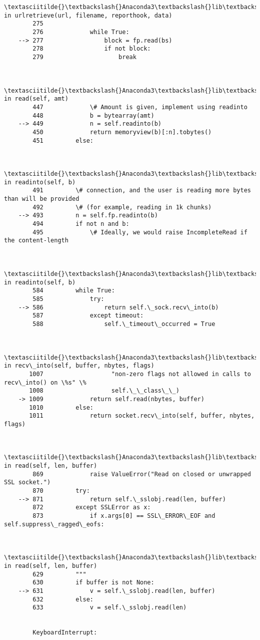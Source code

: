 \documentclass[11pt]{article}
\begin{document}
\begin{Verbatim}[commandchars=\\\{\}]
        \textasciitilde{}\textbackslash{}Anaconda3\textbackslash{}lib\textbackslash{}urllib\textbackslash{}request.py in urlretrieve(url, filename, reporthook, data)
        275 
        276             while True:
    --> 277                 block = fp.read(bs)
        278                 if not block:
        279                     break
    

        \textasciitilde{}\textbackslash{}Anaconda3\textbackslash{}lib\textbackslash{}http\textbackslash{}client.py in read(self, amt)
        447             \# Amount is given, implement using readinto
        448             b = bytearray(amt)
    --> 449             n = self.readinto(b)
        450             return memoryview(b)[:n].tobytes()
        451         else:
    

        \textasciitilde{}\textbackslash{}Anaconda3\textbackslash{}lib\textbackslash{}http\textbackslash{}client.py in readinto(self, b)
        491         \# connection, and the user is reading more bytes than will be provided
        492         \# (for example, reading in 1k chunks)
    --> 493         n = self.fp.readinto(b)
        494         if not n and b:
        495             \# Ideally, we would raise IncompleteRead if the content-length
    

        \textasciitilde{}\textbackslash{}Anaconda3\textbackslash{}lib\textbackslash{}socket.py in readinto(self, b)
        584         while True:
        585             try:
    --> 586                 return self.\_sock.recv\_into(b)
        587             except timeout:
        588                 self.\_timeout\_occurred = True
    

        \textasciitilde{}\textbackslash{}Anaconda3\textbackslash{}lib\textbackslash{}ssl.py in recv\_into(self, buffer, nbytes, flags)
       1007                   "non-zero flags not allowed in calls to recv\_into() on \%s" \%
       1008                   self.\_\_class\_\_)
    -> 1009             return self.read(nbytes, buffer)
       1010         else:
       1011             return socket.recv\_into(self, buffer, nbytes, flags)
    

        \textasciitilde{}\textbackslash{}Anaconda3\textbackslash{}lib\textbackslash{}ssl.py in read(self, len, buffer)
        869             raise ValueError("Read on closed or unwrapped SSL socket.")
        870         try:
    --> 871             return self.\_sslobj.read(len, buffer)
        872         except SSLError as x:
        873             if x.args[0] == SSL\_ERROR\_EOF and self.suppress\_ragged\_eofs:
    

        \textasciitilde{}\textbackslash{}Anaconda3\textbackslash{}lib\textbackslash{}ssl.py in read(self, len, buffer)
        629         """
        630         if buffer is not None:
    --> 631             v = self.\_sslobj.read(len, buffer)
        632         else:
        633             v = self.\_sslobj.read(len)
    

        KeyboardInterrupt: 

    \end{Verbatim}
\end{document}

